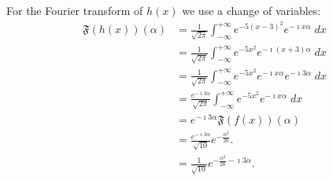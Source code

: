 \documentclass[11pt]{article}
\begin{document}
\begin{solution}
    For the Fourier transform of $h(x)$ we use a change of variables:
    \begin{align*}
        \mathfrak{F}(h(x))(\alpha)
        &= 
        \frac{1}{\sqrt{2\pi}}
        \int_{-\infty}^{+\infty} e^{-5(x-3)^2} e^{ - \imath x \alpha } \;dx
        \\&= 
        \frac{1}{\sqrt{2\pi}}
        \int_{-\infty}^{+\infty} e^{-5x^2} e^{ - \imath (x + 3) \alpha } \;dx
        \\&= 
        \frac{1}{\sqrt{2\pi}}
        \int_{-\infty}^{+\infty} e^{-5x^2} e^{ - \imath x \alpha } e^{ - \imath 3 \alpha }\;dx
        \\&= 
        \frac{ e^{ - \imath 3 \alpha }}{\sqrt{2\pi}}
        \int_{-\infty}^{+\infty} e^{-5x^2} e^{ - \imath x \alpha }\;dx
        \\&= 
        e^{ - \imath 3 \alpha } 
        \mathfrak{F}(f(x))(\alpha)
        \\&= 
        \frac{e^{ - \imath 3 \alpha }}{\sqrt{10}} e^{-\frac{\alpha^2}{20}}.
        \\&= 
        \frac{1}{\sqrt{10}} e^{-\frac{\alpha^2}{20} - \imath 3 \alpha }
        .
    \end{align*}
\end{solution}
\end{document}
